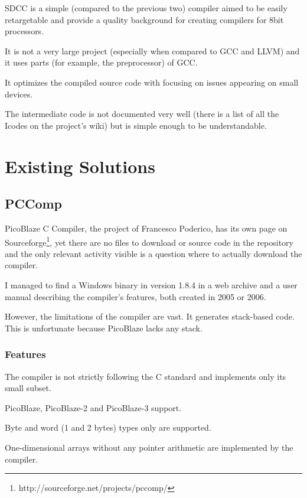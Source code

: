     SDCC is a simple (compared to the previous two) compiler aimed to be easily retargetable and provide a quality background for creating compilers for 8bit processors.

    It is not a very large project (especially when compared to GCC and LLVM) and it uses parts (for example, the preprocessor) of GCC.

    It optimizes the compiled source code with focusing on issues appearing on small devices.

    The intermediate code is not documented very well (there is a list of all the Icodes on the project's wiki) but is simple enough to be understandable.

\chapter{Existing Solutions}\label{existing}

    \section{PCComp}\label{pccomp}

    PicoBlaze C Compiler, the project of Francesco Poderico, has its own page on Sourceforge\footnote{http://sourceforge.net/projects/pccomp/},
    yet there are no files to download or source code in the repository and the only relevant activity visible is a question where to actually download the compiler.

    I managed to find a Windows binary in version 1.8.4 in a web archive and a user manual describing the compiler's features, both created in 2005 or 2006.

    However, the limitations of the compiler are vast. It generates stack-based code. This is unfortunate because PicoBlaze lacks any stack.\cite{pccompman}

        \subsection{Features}

        The compiler is not strictly following the C standard and implements only its small subset.

        PicoBlaze, PicoBlaze-2 and PicoBlaze-3 support.

        Byte and word (1 and 2 bytes) types only are supported.

        One-dimensional arrays without any pointer arithmetic are implemented by the compiler.

